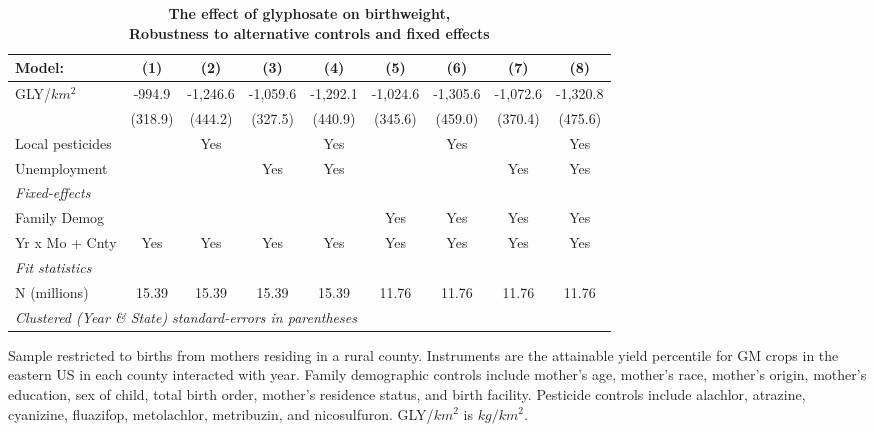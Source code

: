 \begin{table}[htbp]
   \centering
   \small
   \begin{threeparttable}[b]
      \caption{\label{tab:robust-cntrl-dbwt-e100myielddiffpercentilegmo} \textbf{The effect of glyphosate on birthweight, \\ Robustness to alternative controls and fixed effects}}
      \begin{tabular}{lcccccccc}
         \toprule
         Model:           & (1)     & (2)      & (3)      & (4)      & (5)      & (6)      & (7)      & (8)\\  
         \midrule 
         GLY/$km^2$       & -994.9  & -1,246.6 & -1,059.6 & -1,292.1 & -1,024.6 & -1,305.6 & -1,072.6 & -1,320.8\\   
                          & (318.9) & (444.2)  & (327.5)  & (440.9)  & (345.6)  & (459.0)  & (370.4)  & (475.6)\\   
         Local pesticides &         & Yes      &          & Yes      &          & Yes      &          & Yes\\  
         Unemployment     &         &          & Yes      & Yes      &          &          & Yes      & Yes\\  
         \midrule
         \emph{Fixed-effects}\\
         Family Demog     &         &          &          &          & Yes      & Yes      & Yes      & Yes\\  
         Yr x Mo + Cnty   & Yes     & Yes      & Yes      & Yes      & Yes      & Yes      & Yes      & Yes\\  
         \midrule
         \emph{Fit statistics}\\
         N (millions)     & 15.39   & 15.39    & 15.39    & 15.39    & 11.76    & 11.76    & 11.76    & 11.76\\  
         \midrule
         \multicolumn{9}{l}{\emph{Clustered (Year \& State) standard-errors in parentheses}}\\
      \end{tabular}
      
      \begin{tablenotes}\item Sample restricted to births from mothers residing in a rural county. Instruments are the attainable yield percentile for GM crops in the eastern US in each county interacted with year. Family demographic controls include mother's age, mother's race, mother's origin, mother's education, sex of child, total birth order, mother's residence status, and birth facility. Pesticide controls include alachlor, atrazine, cyanizine, fluazifop, metolachlor, metribuzin, and nicosulfuron. GLY/$km^2$ is $kg/km^2$.
      \end{tablenotes}
   \end{threeparttable}
\end{table}
